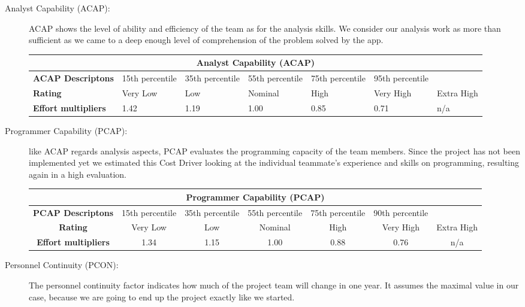 \begin{description}
\item[Analyst Capability (ACAP):] ACAP shows the level of ability and efficiency of the team as for the analysis skills. We consider our analysis work as more than sufficient as we came to a deep enough level of comprehension of the problem solved by the app.

\begin{tabular}{|p{}|p{}|p{}|p{}|p{}|p{}|p{}|}
\hline
         \multicolumn{7}{|c|}{\textbf{Analyst Capability (ACAP)}} \\ \hline  \hline
         	\textbf{ACAP Descriptons} & 15th percentile &35th percentile& 55th percentile& 75th percentile & 95th percentile&\\ \hline
	\textbf{Rating}&Very Low & Low & Nominal  & High & Very High &Extra High\\ \hline
	\textbf{Effort multipliers} & 1.42 & 1.19 & 1.00 & 0.85 & 0.71 & n/a \\ \hline
\end{tabular}

\item[Programmer Capability (PCAP):] like ACAP regards analysis aspects, PCAP evaluates the programming capacity of the team members. Since the project has not been implemented yet we estimated this Cost Driver looking at the individual teammate's experience and skills on programming, resulting again in a high evaluation.

\begin{tabular}{ | c | c | c | c | c | c | c | }
\hline
         \multicolumn{7}{|c|}{\textbf{Programmer Capability (PCAP)}} \\ \hline  \hline
         	\textbf{PCAP Descriptons} & 15th percentile &35th percentile& 55th percentile& 75th percentile & 90th percentile&\\ \hline
	\textbf{Rating}&Very Low & Low & Nominal  & High & Very High &Extra High\\ \hline
	\textbf{Effort multipliers} & 1.34 & 1.15& 1.00 & 0.88 & 0.76 & n/a \\ \hline
\end{tabular}

\item[Personnel Continuity (PCON):] The personnel continuity factor indicates how much of the project team will change in one year. It assumes the maximal value in our case, because we are going to end up the project exactly like we started.


\end{description}
